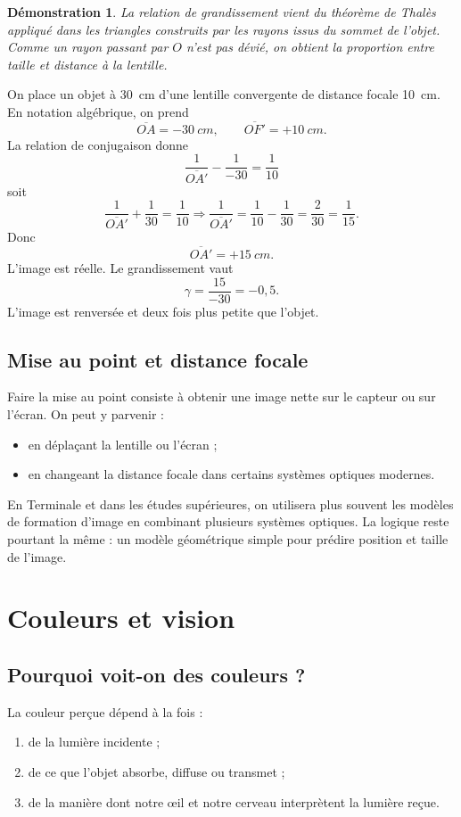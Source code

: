 \documentclass[11pt,a4paper]{article}
\newtheorem*{demonstration}{Démonstration}
\begin{document}
\begin{demonstration}
La relation de grandissement vient du théorème de Thalès appliqué dans les triangles construits par les rayons issus du sommet de l'objet. Comme un rayon passant par $O$ n'est pas dévié, on obtient la proportion entre taille et distance à la lentille.
\end{demonstration}

\begin{exemplebox}
On place un objet à \SI{30}{cm} d'une lentille convergente de distance focale \SI{10}{cm}. En notation algébrique, on prend
\[
\overline{OA}=-\SI{30}{cm},\qquad \overline{OF'}=+\SI{10}{cm}.
\]
La relation de conjugaison donne
\[
\frac{1}{\overline{OA'}}-\frac{1}{-30}=\frac{1}{10}
\]
soit
\[
\frac{1}{\overline{OA'}}+\frac{1}{30}=\frac{1}{10}
\Rightarrow \frac{1}{\overline{OA'}}=\frac{1}{10}-\frac{1}{30}=\frac{2}{30}=\frac{1}{15}.
\]
Donc
\[
\overline{OA'}=+\SI{15}{cm}.
\]
L'image est réelle. Le grandissement vaut
\[
\gamma=\frac{15}{-30}=-0,5.
\]
L'image est renversée et deux fois plus petite que l'objet.
\end{exemplebox}

\subsection{Mise au point et distance focale}
Faire la mise au point consiste à obtenir une image nette sur le capteur ou sur l'écran. On peut y parvenir :
\begin{itemize}
    \item en déplaçant la lentille ou l'écran ;
    \item en changeant la distance focale dans certains systèmes optiques modernes.
\end{itemize}

\begin{ouverture}
En Terminale et dans les études supérieures, on utilisera plus souvent les modèles de formation d'image en combinant plusieurs systèmes optiques. La logique reste pourtant la même : un modèle géométrique simple pour prédire position et taille de l'image.
\end{ouverture}

\section{Couleurs et vision}

\subsection{Pourquoi voit-on des couleurs ?}
La couleur perçue dépend à la fois :
\begin{enumerate}
    \item de la lumière incidente ;
    \item de ce que l'objet absorbe, diffuse ou transmet ;
    \item de la manière dont notre œil et notre cerveau interprètent la lumière reçue.
\end{enumerate}
\end{document}
